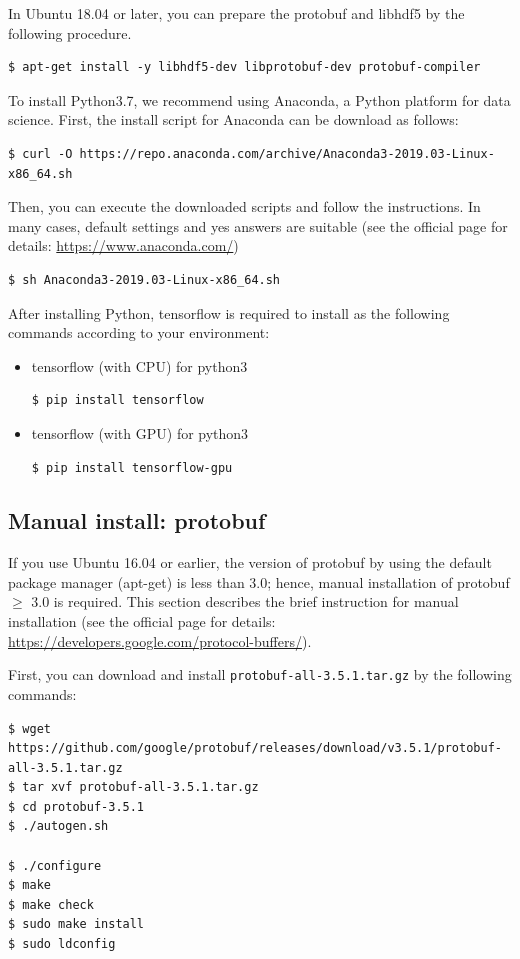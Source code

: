 \documentclass[a4paper]{report}
\begin{document}
In Ubuntu 18.04 or later, you can prepare the protobuf and libhdf5 by the following procedure.
\begin{verbatim}
$ apt-get install -y libhdf5-dev libprotobuf-dev protobuf-compiler 
\end{verbatim}

To install Python3.7, we recommend using Anaconda, a Python platform for data science.
First, the install script for Anaconda can be download as follows: 
\begin{verbatim}
$ curl -O https://repo.anaconda.com/archive/Anaconda3-2019.03-Linux-x86_64.sh
\end{verbatim}

Then, you can execute the downloaded scripts and follow the instructions. In many cases, default settings and yes answers are suitable (see the official page for details: \url{https://www.anaconda.com/})

\begin{verbatim}
$ sh Anaconda3-2019.03-Linux-x86_64.sh
\end{verbatim}

After installing Python, tensorflow is required to install as the following commands according to your environment:
\begin{itemize}
	\item tensorflow (with CPU) for python3
	\begin{verbatim}
$ pip install tensorflow
	\end{verbatim}
	\item  tensorflow (with GPU) for python3
	\begin{verbatim}
$ pip install tensorflow-gpu
	\end{verbatim}
\end{itemize}


\subsection*{Manual install: protobuf}
If you use Ubuntu 16.04 or earlier, the version of protobuf by using the default package manager (apt-get) is less than 3.0; hence, manual installation of protobuf $\geq$ 3.0 is required.
This section describes the brief instruction for manual installation (see the official page for details: \url{https://developers.google.com/protocol-buffers/}).

First, you can download and install {\tt protobuf-all-3.5.1.tar.gz} by the following commands:
\begin{verbatim}
$ wget https://github.com/google/protobuf/releases/download/v3.5.1/protobuf-all-3.5.1.tar.gz
$ tar xvf protobuf-all-3.5.1.tar.gz
$ cd protobuf-3.5.1
$ ./autogen.sh

$ ./configure
$ make
$ make check
$ sudo make install
$ sudo ldconfig
\end{verbatim}
\end{document}
